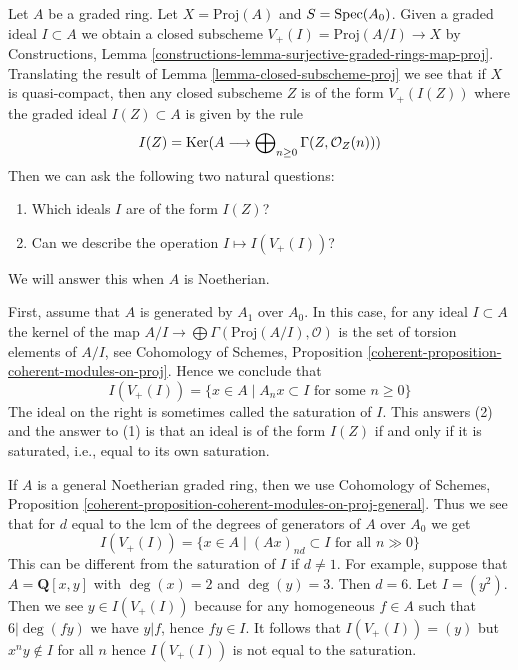 \begin{example}
\label{example-closed-subscheme-of-proj}
Let $A$ be a graded ring. Let $X = \text{Proj}(A)$ and $S = \mathop{\mathrm{Spec}}(A_0)$.
Given a graded ideal $I \subset A$ we obtain a closed subscheme
$V_+(I) = \text{Proj}(A/I) \to X$ by Constructions, Lemma
\ref{constructions-lemma-surjective-graded-rings-map-proj}.
Translating the result of Lemma \ref{lemma-closed-subscheme-proj}
we see that if $X$ is quasi-compact, then any closed subscheme $Z$
is of the form $V_+(I(Z))$ where the graded ideal $I(Z) \subset A$
is given by the rule
$$
I(Z) = \mathop{\mathrm{Ker}}(A \longrightarrow
\bigoplus\nolimits_{n \geq 0} \Gamma(Z, \mathcal{O}_Z(n)))
$$
Then we can ask the following two natural questions:
\begin{enumerate}
\item Which ideals $I$ are of the form $I(Z)$?
\item Can we describe the operation $I \mapsto I(V_+(I))$?
\end{enumerate}
We will answer this when $A$ is Noetherian.

\medskip\noindent
First, assume that $A$ is generated by $A_1$ over $A_0$. In this case,
for any ideal $I \subset A$ the kernel of the map
$A/I \to \bigoplus \Gamma(\text{Proj}(A/I), \mathcal{O})$
is the set of torsion elements of $A/I$, see
Cohomology of Schemes, Proposition
\ref{coherent-proposition-coherent-modules-on-proj}.
Hence we conclude that
$$
I(V_+(I)) = \{x \in A \mid A_n x \subset I\text{ for some }n \geq 0\}
$$
The ideal on the right is sometimes called the saturation of $I$.
This answers (2) and the answer to (1) is that an ideal is
of the form $I(Z)$ if and only if it is saturated, i.e., equal
to its own saturation.

\medskip\noindent
If $A$ is a general Noetherian graded ring, then we use
Cohomology of Schemes, Proposition
\ref{coherent-proposition-coherent-modules-on-proj-general}.
Thus we see that for $d$ equal to the lcm of the degrees
of generators of $A$ over $A_0$ we get
$$
I(V_+(I)) = \{x \in A \mid (Ax)_{nd} \subset I\text{ for all }n \gg 0\}
$$
This can be different from the saturation of $I$ if $d \not = 1$.
For example, suppose that $A = \mathbf{Q}[x, y]$
with $\deg(x) = 2$ and $\deg(y) = 3$. Then $d = 6$.
Let $I = (y^2)$. Then we see $y \in I(V_+(I))$ because
for any homogeneous $f \in A$ such that $6 | \deg(fy)$
we have $y | f$, hence $fy \in I$. It follows that
$I(V_+(I)) = (y)$ but $x^n y \not \in I$ for all $n$
hence $I(V_+(I))$ is not equal to the saturation.
\end{example}

